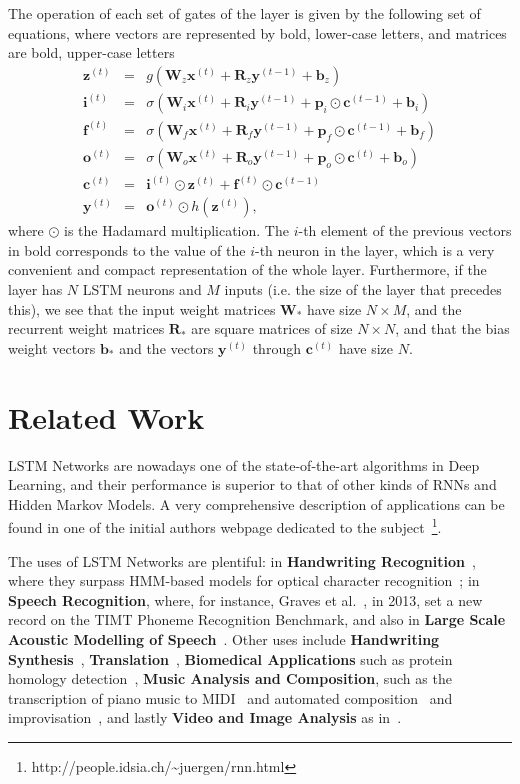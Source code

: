 \documentclass{IEEEtran}
\newcommand{\mb}[1]{\mathbf{#1}}
\begin{document}
The operation of each set of gates of the layer is given by the following set of equations, where vectors are
represented by bold, lower-case letters, and matrices are bold, upper-case letters
\begin{eqnarray}
    \mb{z}^{(t)} & = & g(\mb{W}_z \mb{x}^{(t)} + \mb{R}_z \mb{y}^{(t-1)} + \mb{b}_z) \nonumber\\
    \mb{i}^{(t)} & = & \sigma(\mb{W}_i \mb{x}^{(t)} + \mb{R}_i \mb{y}^{(t-1)} + \mb{p}_i \odot \mb{c}^{(t-1)} + \mb{b}_i) \nonumber\\
    \mb{f}^{(t)} & = & \sigma(\mb{W}_f \mb{x}^{(t)} + \mb{R}_f \mb{y}^{(t-1)} + \mb{p}_f \odot \mb{c}^{(t-1)} + \mb{b}_f) \nonumber\\
    \mb{o}^{(t)} & = & \sigma(\mb{W}_o \mb{x}^{(t)} + \mb{R}_o \mb{y}^{(t-1)} + \mb{p}_o \odot \mb{c}^{(t)} + \mb{b}_o) \nonumber\\
    \mb{c}^{(t)} & = & \mb{i}^{(t)} \odot \mb{z}^{(t)} + \mb{f}^{(t)} \odot \mb{c}^{(t-1)} \nonumber \\
    \mb{y}^{(t)} & = & \mb{o}^{(t)} \odot h(\mb{z}^{(t)}) \label{eq:equationsLSTM},
\end{eqnarray}
where $\odot$ is the Hadamard multiplication. The $i$-th element of the previous vectors in bold corresponds
to the value of the $i$-th neuron in the layer, which is a very convenient and compact representation of the
whole layer. Furthermore, if the layer has $N$ LSTM neurons and $M$ inputs (i.e. the size of the layer that
precedes this), we see that the input weight matrices $\mb{W}_*$ have size $N \times M$, and the  recurrent
weight matrices $\mb{R}_*$ are square matrices of size $N \times N$, and that the bias weight vectors $\mb{b}_*$
and the vectors $\mb{y}^{(t)}$ through $\mb{c}^{(t)}$ have size $N$.

\section{Related Work}\label{sec:relwork}
LSTM Networks are nowadays one of the state-of-the-art algorithms in Deep Learning, and their performance is
superior to that of other kinds of RNNs and Hidden Markov Models. A very comprehensive description of applications can be found in one of the initial
authors webpage dedicated to the subject~\footnote{http://people.idsia.ch/\~{}juergen/rnn.html}.

The uses of LSTM Networks are plentiful: in \textbf{Handwriting Recognition}~\cite{ICDAR09}, where they surpass
HMM-based models for optical character recognition~\cite{Breuel13}; in \textbf{Speech Recognition}, where, for
instance, Graves et al.~\cite{Graves13}, in 2013, set a new record on the TIMT Phoneme Recognition Benchmark,
and also in \textbf{Large Scale Acoustic Modelling of Speech}~\cite{Sak14}. Other uses include
\textbf{Handwriting Synthesis}~\cite{Graves13_2}, \textbf{Translation}~\cite{Sustkever14}, \textbf{Biomedical Applications} such
as protein homology detection~\cite{Hochreiter07}, \textbf{Music Analysis and Composition}, such as the transcription of piano music
to MIDI~\cite{Bock12} and automated composition~\cite{Coca13} and improvisation~\cite{Eck02}, and lastly \textbf{Video and Image Analysis} as
in~\cite{Vinyals14, Donahue14, Donahue14_2}.
\end{document}
